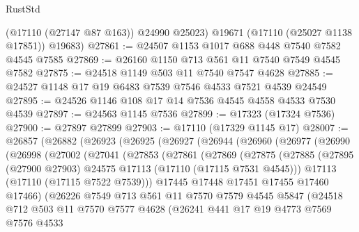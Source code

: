 \begin{lexlean}{RustStd}
\begin{coremodule}
        (@17110 (@27147 @87 @163))
        @24990
        @25023)
      @19671
      (@17110 (@25027 @1138 @17851))
      @19683)
@27861 := @24507 @1153 @1017 @688 @448 @7540 @7582 @4545 @7585
@27869 := @26160 @1150 @713 @561 @11 @7540 @7549 @4545 @7582
@27875 := @24518 @1149 @503 @11 @7540 @7547 @4628
@27885 := @24527 @1148 @17 @19 @6483 @7539 @7546 @4533 @7521 @4539 @24549
@27895 := @24526 @1146 @108 @17 @14 @7536 @4545 @4558 @4533 @7530 @4539
@27897 := @24563 @1145 @7536
@27899 := @17323 (@17324 @7536)
@27900 := @27897 @27899
@27903 := @17110 (@17329 @1145 @17)
@28007 := @26857
    (@26882
      (@26923
        (@26925
          (@26927
            (@26944
              (@26960
                (@26977
                  (@26990
                    (@26998
                      (@27002
                        (@27041
                          (@27853
                            (@27861
                              (@27869
                                (@27875
                                  (@27885
                                    (@27895
                                      (@27900 @27903)
                                      @24575
                                      @17113
                                      (@17110 (@17115 @7531 @4545)))
                                    @17113
                                    (@17110 (@17115 @7522 @7539)))
                                  @17445
                                  @17448
                                  @17451
                                  @17455
                                  @17460
                                  @17466)
                                (@26226
                                  @7549
                                  @713
                                  @561
                                  @11
                                  @7570
                                  @7579
                                  @4545
                                  @5847
                                  (@24518
                                    @712
                                    @503
                                    @11
                                    @7570
                                    @7577
                                    @4628
                                    (@26241
                                      @441
                                      @17
                                      @19
                                      @4773
                                      @7569
                                      @7576
                                      @4533

\end{coremodule}
\end{lexlean}
